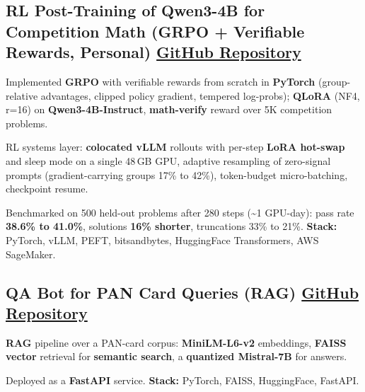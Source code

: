 \documentclass[letter,10pt]{article}
\begin{document}
\subsection{RL Post-Training of Qwen3-4B for Competition Math (GRPO + Verifiable Rewards, Personal) \hfill \href{https://github.com/sunil448832/preference-alignment-grpo}{GitHub Repository}}
\begin{zitemize}
\item Implemented \textbf{GRPO} with verifiable rewards from scratch in \textbf{PyTorch} (group-relative advantages, clipped policy gradient, tempered log-probs); \textbf{QLoRA} (NF4, r=16) on \textbf{Qwen3-4B-Instruct}, \textbf{math-verify} reward over 5K competition problems.
\item RL systems layer: \textbf{colocated vLLM} rollouts with per-step \textbf{LoRA hot-swap} and sleep mode on a single 48\,GB GPU, adaptive resampling of zero-signal prompts (gradient-carrying groups 17\% to 42\%), token-budget micro-batching, checkpoint resume.
\item Benchmarked on 500 held-out problems after 280 steps (\textasciitilde1 GPU-day): pass rate \textbf{38.6\% to 41.0\%}, solutions \textbf{16\% shorter}, truncations 33\% to 21\%. \textbf{Stack:} PyTorch, vLLM, PEFT, bitsandbytes, HuggingFace Transformers, AWS SageMaker.
\end{zitemize}

\subsection{QA Bot for PAN Card Queries (RAG) \hfill \href{https://github.com/sunil448832/Natural-Language-Processing/tree/master/RAG(Retrieval\%20Augment\%20Generation)}{GitHub Repository}}
\begin{zitemize}
\item \textbf{RAG} pipeline over a PAN-card corpus: \textbf{MiniLM-L6-v2} embeddings, \textbf{FAISS} \textbf{vector} retrieval for \textbf{semantic search}, a \textbf{quantized Mistral-7B} for answers.
\item Deployed as a \textbf{FastAPI} service. \textbf{Stack:} PyTorch, FAISS, HuggingFace, FastAPI.
\end{zitemize}
\end{document}
